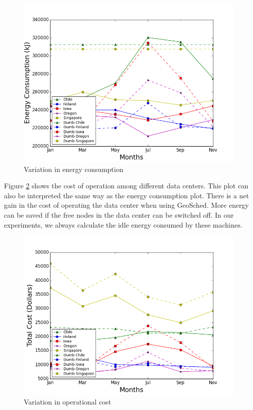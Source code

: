 \documentclass[conference,12pt]{IEEEtran}
\begin{document}
\begin{figure}[H]
\includegraphics[scale=0.45]{energy}
\caption{ Variation in energy consumption}
 \label{fig:dcenergy}
\end{figure}

Figure \ref{fig:dccost} shows the cost of operation among different data centers. This plot can also be interpreted the same way as the energy consumption plot. There is a net gain in the cost of operating the data center when using GeoSched. More energy can be saved if the free nodes in the data center can be switched off. In our experiments, we always calculate the idle energy consumed by these machines.


\begin{figure}[]
\includegraphics[scale=0.45]{dollars}
\caption{ Variation in operational cost}
 \label{fig:dccost}
\end{figure}
\end{document}
